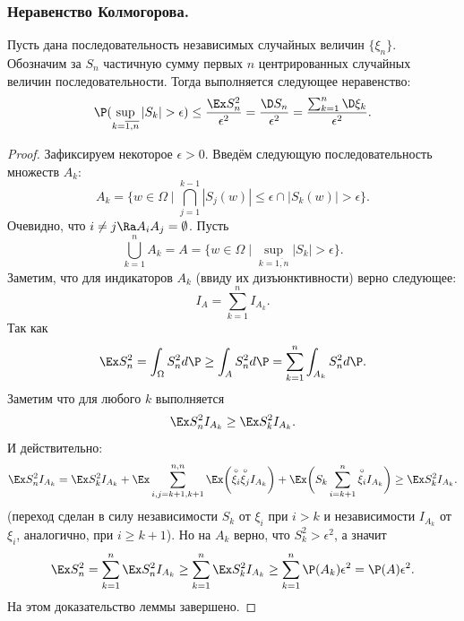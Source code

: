 \subsubsection{Неравенство Колмогорова.}
\begin{lemma}
    Пусть дана последовательность независимых случайных величин $\{\xi_n\}$.
    Обозначим за $S_n$ частичную сумму первых $n$ центрированных случайных величин последовательности.
    Тогда выполняется следующее неравенство:
    \[
        \P(\sup\limits_{k = \overline{1, n}}|S_k| > \epsilon) \leq \dfrac{\Ex S_n^2}{\epsilon^2} = \dfrac{\D S_n}{\epsilon^2} = \dfrac{\sum_{k = 1}^{n} \D \xi_k}{\epsilon^2}.
    \]
\end{lemma}
\begin{proof}
    Зафиксируем некоторое $\epsilon > 0$.
    Введём следующую последовательность множеств $A_k$:
    \[
        A_k = \{w \in \Omega \mid \bigcap\limits_{j = 1}^{k - 1} |S_j(w)| \leq \epsilon \cap |S_{k}(w)| > \epsilon\}.
    \]
    Очевидно, что $i \neq j \Ra A_{i}A_j = \emptyset$.
    Пусть
    \[
        \bigcup\limits_{k = 1}^n A_k = A = \{w \in \Omega \mid \sup\limits_{k = \overline{1, n}} |S_k| > \epsilon\}.
    \]
    Заметим, что для индикаторов $A_k$ (ввиду их дизъюнктивности) верно следующее:
    \[
        I_{A} = \sum\limits_{k = 1}^n I_{A_k}.
    \]
    Так как
    \[
        \Ex S_n^2 = \int_{\Omega} S^2_n d\P \geq \int_{A} S^2_n d\P = \sum\limits_{k = 1}^{n} \int_{A_k} S^2_n d\P.
    \]
    Заметим что для любого $k$ выполняется
    \[
        \Ex S_n^2 I_{A_k} \geq \Ex S_{k}^2 I_{A_k}.
    \]
    И действительно:
    \[
        \Ex S_n^2 I_{A_k} = \Ex S_k^2 I_{A_k} + \Ex \sum\limits_{i, j = k + 1, k + 1}^{n, n} \Ex \biggr(\overset{\circ}{\xi_i} \overset{\circ}{\xi_j} I_{A_k}\biggr) + \Ex \biggr( S_k \sum\limits_{i = k + 1}^{n} \overset{\circ}{\xi_i} I_{A_k}\biggr) \geq \Ex S_k^2 I_{A_k}.
    \]
    (переход сделан в силу независимости $S_k$ от $\xi_{i}$ при $i > k$ и независимости $I_{A_k}$ от $\xi_{i}$, аналогично, при $i \geq k + 1$).
    Но на $A_k$ верно, что $S_k^2 > \epsilon^2$, а значит
    \[
        \Ex S_n^2 = \sum\limits_{k = 1}^{n} \Ex S_n^2 I_{A_k} \geq \sum\limits_{k = 1}^{n} \Ex S_k^2 I_{A_k} \geq \sum\limits_{k = 1}^{n} \P(A_k)\epsilon^2 = \P(A) \epsilon^2.
    \]
    На этом доказательство леммы завершено.
\end{proof}

